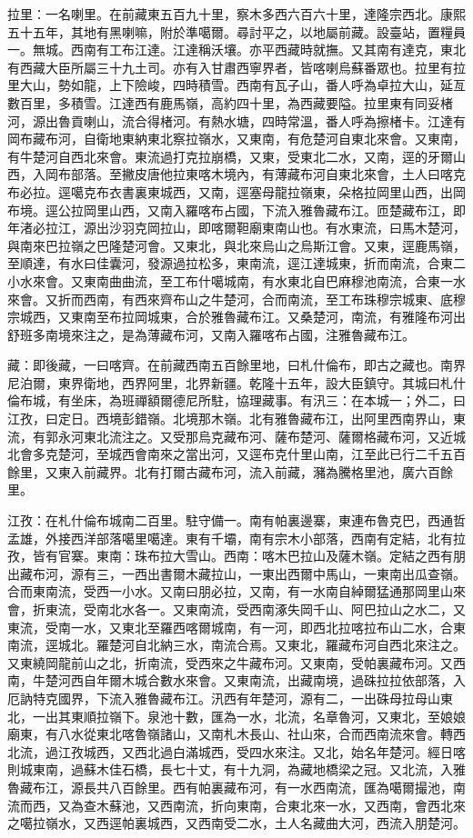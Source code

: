 \begin{pinyinscope}
拉里：一名喇里。在前藏東五百九十里，察木多西六百六十里，達隆宗西北。康熙五十五年，其地有黑喇嘛，附於準噶爾。尋討平之，以地屬前藏。設臺站，置糧員一。無城。西南有工布江達。江達稱沃壤。亦平西藏時就撫。又其南有達克，東北有西藏大臣所屬三十九土司。亦有入甘肅西寧界者，皆喀喇烏蘇番眾也。拉里有拉里大山，勢如龍，上下險峻，四時積雪。西南有瓦子山，番人呼為卓拉大山，延亙數百里，多積雪。江達西有鹿馬嶺，高約四十里，為西藏要隘。拉里東有同妥楮河，源出魯貢喇山，流合得楮河。有熱水塘，四時常溫，番人呼為擦楮卡。江達有岡布藏布河，自衛地東納東北察拉嶺水，又東南，有危楚河自東北來會。又東南，有牛楚河自西北來會。東流過打克拉崩橋，又東，受東北二水，又南，逕的牙爾山西，入岡布部落。至撇皮唐他拉東喀木境內，有薄藏布河自東北來會，土人曰喀克布必拉。逕噶克布衣書裏東城西，又南，逕塞母龍拉嶺東，朵格拉岡里山西，出岡布境。逕公拉岡里山西，又南入羅喀布占國，下流入雅魯藏布江。匝楚藏布江，即年渚必拉江，源出沙羽克岡拉山，即喀爾靼廟東南山也。有水東流，曰馬木楚河，與南來巴拉嶺之巴隆楚河會。又東北，與北來烏山之烏斯江會。又東，逕鹿馬嶺，至順達，有水曰佳囊河，發源過拉松多，東南流，逕江達城東，折而南流，合東二小水來會。又東南曲曲流，至工布什噶城南，有水東北自巴麻穆池南流，合東一水來會。又折而西南，有西來齊布山之牛楚河，合而南流，至工布珠穆宗城東、底穆宗城西，又東南至布拉岡城東，合於雅魯藏布江。又桑楚河，南流，有雅隆布河出舒班多南境來注之，是為薄藏布河，又南入羅喀布占國，注雅魯藏布江。

藏：即後藏，一曰喀齊。在前藏西南五百餘里地，曰札什倫布，即古之藏也。南界尼泊爾，東界衛地，西界阿里，北界新疆。乾隆十五年，設大臣鎮守。其城曰札什倫布城，有坐床，為班禪額爾德尼所駐，協理藏事。有汛三：在本城一；外二，曰江孜，曰定日。西境彭錯嶺。北境那木嶺。北有雅魯藏布江，出阿里西南界山，東流，有郭永河東北流注之。又受那烏克藏布河、薩布楚河、薩爾格藏布河，又近城北會多克楚河，至城西會南來之當出河，又逕布克什里山南，江至此已行二千五百餘里，又東入前藏界。北有打爾古藏布河，流入前藏，瀦為騰格里池，廣六百餘里。

江孜：在札什倫布城南二百里。駐守備一。南有帕裏邊寨，東連布魯克巴，西通哲孟雄，外接西洋部落噶里噶達。東有千壩，南有宗木小部落，西南有定結，北有拉孜，皆有官寨。東南：珠布拉大雪山。西南：喀木巴拉山及薩木嶺。定結之西有朋出藏布河，源有三，一西出書爾木藏拉山，一東出西爾中馬山，一東南出瓜查嶺。合而東南流，受西一小水。又南曰朋必拉，又南，有一水南自綽爾猛通那岡里山來會，折東流，受南北水各一。又東南流，受西南涿失岡千山、阿巴拉山之水二，又東流，受南一水，又東北至羅西喀爾城南，有一河，即西北拉喀拉布山二水，合東南流，逕城北。羅楚河自北納三水，南流合焉。又東北，羅藏布河自西北來注之。又東繞岡龍前山之北，折南流，受西來之牛藏布河。又東南，受帕裏藏布河。又西南，牛楚河西自年爾木城合數水來會。又東南流，出藏南境，過硃拉拉依部落，入厄訥特克國界，下流入雅魯藏布江。汛西有年楚河，源有二，一出硃母拉母山東北，一出其東順拉嶺下。泉池十數，匯為一水，北流，名章魯河，又東北，至娘娘廟東，有八水從東北喀魯嶺諸山，又南札木長山、社山來，合而西南流來會。轉西北流，過江孜城西，又西北過白滿城西，受四水來注。又北，始名年楚河。經日喀則城東南，過蘇木佳石橋，長七十丈，有十九洞，為藏地橋梁之冠。又北流，入雅魯藏布江，源長共八百餘里。西有帕裏藏布河，有一水西南流，匯為噶爾撮池，南流而西，又為查木蘇池，又西南流，折向東南，合東北來一水，又西南，會西北來之噶拉嶺水，又西逕帕裏城西，又西南受二水，土人名藏曲大河，西流入朋楚河。


\end{pinyinscope}
